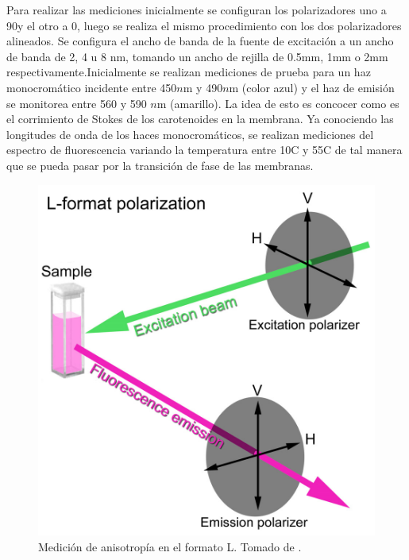 \documentclass[12pt]{article}
\begin{document}
\begin{itemize}
Para realizar las mediciones inicialmente se configuran los polarizadores uno a 90\textdegree y el otro a 0\textdegree, luego se realiza el mismo procedimiento con los dos polarizadores alineados. Se configura el ancho de banda de la fuente de excitación a un ancho de banda de 2, 4 u 8 nm, tomando un ancho de rejilla de 0.5mm, 1mm o 2mm respectivamente.Inicialmente se realizan mediciones de prueba para un haz monocromático incidente entre 450$n$m y 490$n$m (color azul) y el haz de emisión se monitorea entre 560 y 590 $n$m (amarillo). La idea de esto es concocer como es el corrimiento de Stokes de los carotenoides en la membrana. Ya conociendo las longitudes de onda de los haces monocromáticos, se realizan mediciones del espectro de fluorescencia variando la temperatura entre  10\textdegree C y 55\textdegree C de tal manera que se pueda pasar por la transición de fase de las membranas.\\
\begin{figure}[h]
\centering
\includegraphics[scale=0.15]{aniso.png}
\caption{Medición de anisotropía en el formato L. Tomado de \cite{Lakowicz2006}.}
\label{fig:aniso}
\end{figure}
\end{itemize}

\end{document}
